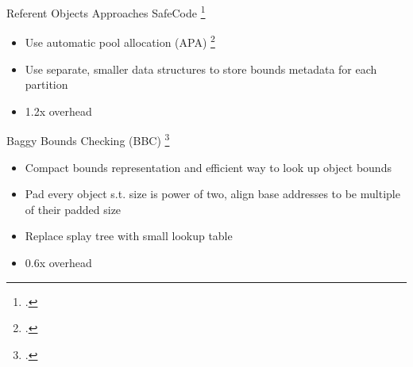 \documentclass[aspectratio=169]{beamer}
\begin{document}
\begin{frame}[fragile]{Referent Objects Approaches}
SafeCode \footcite{dhurjati_backwards-compatible_2006}
    \begin{itemize}
        \item Use automatic pool allocation (APA) \footcite{lattner_automatic_2005} 
        \item Use separate, \alert{smaller} data structures to store bounds metadata for \alert{each partition}
        \item 1.2x overhead
    \end{itemize}

\pause

Baggy Bounds Checking (BBC) \footcite{akritidis_baggy_2009}
    \begin{itemize}
    \item Compact bounds representation and efficient way to look up object bounds
    \item Pad every object s.t. size is power of two, align base addresses to be multiple of their padded size
    \item Replace splay tree with small lookup table
    \item 0.6x overhead 
    \end{itemize}
\vspace{0.2in}

\end{frame}
\end{document}
